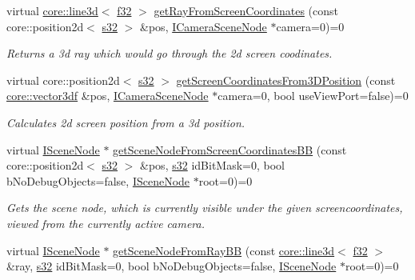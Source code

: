 \begin{DoxyCompactItemize}
virtual \hyperlink{classirr_1_1core_1_1line3d}{core\+::line3d}$<$ \hyperlink{namespaceirr_a0277be98d67dc26ff93b1a6a1d086b07}{f32} $>$ \hyperlink{classirr_1_1scene_1_1ISceneCollisionManager_adb95809ed422e138405f30844740666b}{get\+Ray\+From\+Screen\+Coordinates} (const core\+::position2d$<$ \hyperlink{namespaceirr_ac66849b7a6ed16e30ebede579f9b47c6}{s32} $>$ \&pos, \hyperlink{classirr_1_1scene_1_1ICameraSceneNode}{I\+Camera\+Scene\+Node} $\ast$camera=0)=0
\begin{DoxyCompactList}\small\item\em Returns a 3d ray which would go through the 2d screen coodinates. \end{DoxyCompactList}\item 
virtual core\+::position2d$<$ \hyperlink{namespaceirr_ac66849b7a6ed16e30ebede579f9b47c6}{s32} $>$ \hyperlink{classirr_1_1scene_1_1ISceneCollisionManager_a6032377ff769e42c3e28547794f015ea}{get\+Screen\+Coordinates\+From3\+D\+Position} (const \hyperlink{namespaceirr_1_1core_a06f169d08b5c429f5575acb7edbad811}{core\+::vector3df} \&pos, \hyperlink{classirr_1_1scene_1_1ICameraSceneNode}{I\+Camera\+Scene\+Node} $\ast$camera=0, bool use\+View\+Port=false)=0
\begin{DoxyCompactList}\small\item\em Calculates 2d screen position from a 3d position. \end{DoxyCompactList}\item 
virtual \hyperlink{classirr_1_1scene_1_1ISceneNode}{I\+Scene\+Node} $\ast$ \hyperlink{classirr_1_1scene_1_1ISceneCollisionManager_aca97a47ae237373bbd681268a462f4a0}{get\+Scene\+Node\+From\+Screen\+Coordinates\+BB} (const core\+::position2d$<$ \hyperlink{namespaceirr_ac66849b7a6ed16e30ebede579f9b47c6}{s32} $>$ \&pos, \hyperlink{namespaceirr_ac66849b7a6ed16e30ebede579f9b47c6}{s32} id\+Bit\+Mask=0, bool b\+No\+Debug\+Objects=false, \hyperlink{classirr_1_1scene_1_1ISceneNode}{I\+Scene\+Node} $\ast$root=0)=0
\begin{DoxyCompactList}\small\item\em Gets the scene node, which is currently visible under the given screencoordinates, viewed from the currently active camera. \end{DoxyCompactList}\item 
virtual \hyperlink{classirr_1_1scene_1_1ISceneNode}{I\+Scene\+Node} $\ast$ \hyperlink{classirr_1_1scene_1_1ISceneCollisionManager_a420ffad2d3a8bcd2f51b504cb8709ac6}{get\+Scene\+Node\+From\+Ray\+BB} (const \hyperlink{classirr_1_1core_1_1line3d}{core\+::line3d}$<$ \hyperlink{namespaceirr_a0277be98d67dc26ff93b1a6a1d086b07}{f32} $>$ \&ray, \hyperlink{namespaceirr_ac66849b7a6ed16e30ebede579f9b47c6}{s32} id\+Bit\+Mask=0, bool b\+No\+Debug\+Objects=false, \hyperlink{classirr_1_1scene_1_1ISceneNode}{I\+Scene\+Node} $\ast$root=0)=0

\end{DoxyCompactItemize}
